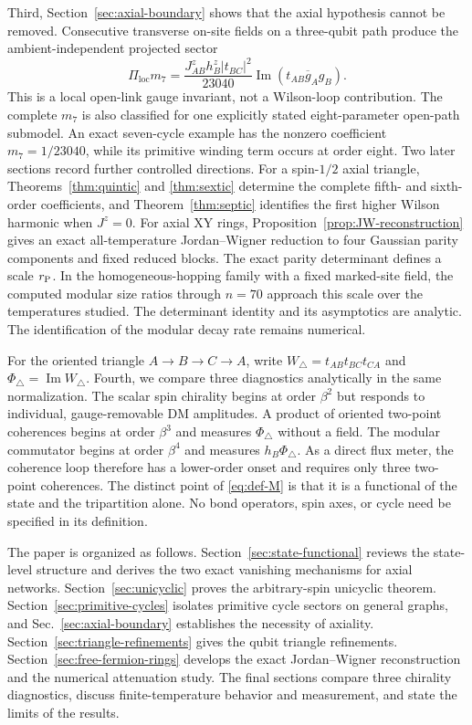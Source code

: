\documentclass[aps,prb,preprint,nofootinbib,longbibliography]{revtex4-2}
\newcommand{\Wtri}{W_\triangle}
\newcommand{\PhiTri}{\Phi_\triangle}
\begin{document}
Third, Section~\ref{sec:axial-boundary} shows that the axial hypothesis cannot
be removed.  Consecutive transverse on-site fields on a three-qubit path
produce the ambient-independent projected sector
\begin{equation}
 \Pi_{\mathrm{loc}}m_7
 =\frac{J_{AB}^zh_B^z|t_{BC}|^2}{23040}
 \operatorname{Im}(t_{AB}\overline g_Ag_B).
 \label{eq:intro-local-background}
\end{equation}
This is a local open-link gauge invariant, not a Wilson-loop contribution.
The complete $m_7$ is also classified for one explicitly stated
eight-parameter open-path submodel.  An exact seven-cycle example has the
nonzero coefficient $m_7=1/23040$, while its primitive winding term occurs at
order eight.  Two later sections record further controlled directions.  For
a spin-$1/2$ axial triangle, Theorems~\ref{thm:quintic} and
\ref{thm:sextic} determine the complete fifth- and sixth-order coefficients,
and Theorem~\ref{thm:septic} identifies the first higher Wilson harmonic when
$J^z=0$.  For axial XY rings, Proposition~\ref{prop:JW-reconstruction} gives
an exact all-temperature Jordan--Wigner reduction to four Gaussian parity
components and fixed reduced blocks.  The exact parity determinant defines a
scale $r_{\rm P}$.  In the homogeneous-hopping family with a fixed marked-site
field, the computed modular size ratios through $n=70$ approach this scale
over the temperatures studied.  The
determinant identity and its asymptotics are analytic.  The identification of
the modular decay rate remains numerical.

For the oriented triangle $A\to B\to C\to A$, write
$\Wtri=t_{AB}t_{BC}t_{CA}$ and $\PhiTri=\operatorname{Im}\Wtri$.
Fourth, we compare three diagnostics analytically in
the same normalization.
The scalar spin chirality begins at order $\beta^2$ but responds to individual,
gauge-removable DM amplitudes.  A product of oriented two-point coherences
begins at order $\beta^3$ and measures $\PhiTri$ without a field.  The modular
commutator begins at order $\beta^4$ and measures $h_B\PhiTri$.  As a direct
flux meter, the coherence loop therefore has a lower-order onset and requires
only three two-point coherences.
The distinct point of \eqref{eq:def-M} is that it is a functional of the state
and the tripartition alone.  No bond operators, spin axes, or cycle need be
specified in its definition.

The paper is organized as follows.  Section~\ref{sec:state-functional}
reviews the state-level structure and derives the two exact vanishing
mechanisms for axial networks.  Section~\ref{sec:unicyclic} proves the
arbitrary-spin unicyclic theorem.  Section~\ref{sec:primitive-cycles}
isolates primitive cycle sectors on general graphs, and
Sec.~\ref{sec:axial-boundary} establishes the necessity of axiality.
Section~\ref{sec:triangle-refinements} gives the qubit triangle refinements.
Section~\ref{sec:free-fermion-rings} develops the exact Jordan--Wigner
reconstruction and the numerical attenuation study.  The final sections
compare three chirality diagnostics, discuss finite-temperature behavior and
measurement, and state the limits of the results.
\end{document}
